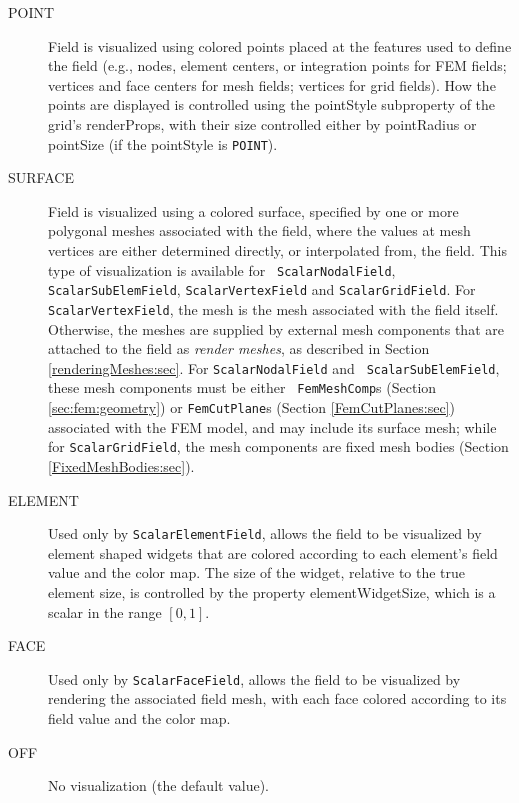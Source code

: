 \begin{description}

\item[POINT]\mbox{}

Field is visualized using colored points placed at the features used
to define the field (e.g., nodes, element centers, or integration
points for FEM fields; vertices and face centers for mesh fields;
vertices for grid fields). How the points are displayed is controlled
using the {\sf pointStyle} subproperty of the grid's {\sf
renderProps}, with their size controlled either by {\sf pointRadius}
or {\sf pointSize} (if the {\sf pointStyle} is {\tt POINT}).

\item[SURFACE]\mbox{}

Field is visualized using a colored surface, specified by one or more
polygonal meshes associated with the field, where the values at mesh
vertices are either determined directly, or interpolated from, the
field. This type of visualization is available for {\tt
ScalarNodalField}, {\tt ScalarSubElemField}, {\tt ScalarVertexField}
and {\tt ScalarGridField}. For {\tt ScalarVertexField}, the mesh is
the mesh associated with the field itself. Otherwise, the meshes are
supplied by external mesh components that are attached to the field as
{\it render meshes}, as described in Section
\ref{renderingMeshes:sec}. For {\tt ScalarNodalField} and {\tt
ScalarSubElemField}, these mesh components must be either {\tt
FemMeshComp}s (Section \ref{sec:fem:geometry}) or {\tt FemCutPlane}s
(Section \ref{FemCutPlanes:sec}) associated with the FEM model, and
may include its surface mesh; while for {\tt ScalarGridField}, the
mesh components are fixed mesh bodies
(Section \ref{FixedMeshBodies:sec}).

\item[ELEMENT]\mbox{}

Used only by {\tt ScalarElementField}, allows the field to be
visualized by element shaped widgets that are colored according to
each element's field value and the color map. The size of the widget,
relative to the true element size, is controlled by the property {\sf
elementWidgetSize}, which is a scalar in the range $[0,1]$.

\item[FACE]\mbox{}

Used only by {\tt ScalarFaceField}, allows the field to be visualized
by rendering the associated field mesh, with each face colored
according to its field value and the color map.

\item[OFF]\mbox{}

No visualization (the default value).
	
\end{description}

